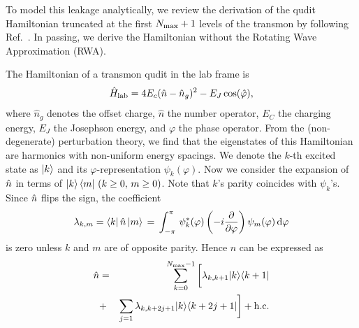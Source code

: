 To model this leakage analytically, we review the derivation of the qudit Hamiltonian truncated at the first $N_{\mathrm{max}}+1$
levels of the transmon by following Ref.~\cite{99999}.
In passing, we derive the Hamiltonian without the Rotating Wave Approximation (RWA)\cite{Fujii2017}.

The Hamiltonian of a transmon qudit in the lab frame is \cite{wong2025hardware}
\begin{equation}
  \hat{H}_{\text{lab}} = 4E_c({\hat{n}} - {\hat{n}}_g)^2 - E_J \cos(\hat{\varphi}), \label{eq:lab}
\end{equation}
where $\hat{n}_g$ denotes the offset charge, $\hat{n}$ the number operator, $E_C$ the charging energy, $E_J$ the Josephson
energy, and $\varphi$ the phase operator.
From the (non-degenerate) perturbation theory, we find that the eigenstates of this Hamiltonian are
harmonics with non-uniform energy spacings.
We denote the $k$-th excited state as $\ket{k}$ and its $\varphi$-representation $\psi_k(\varphi)$.
Now we consider the expansion of ${\hat{n}}$ in terms of $\ket{k}\bra{m}\, (k\geq 0,\, m\geq 0)$.
Note that $k$'s parity coincides with $\psi_k$'s.
Since ${\hat{n}}$ flips the sign, the coefficient
\begin{equation}
  \lambda_{k,m}=\bra{k}{\hat{n}}\ket{m}\,=\,\int_{-\pi}^\pi\,\psi_k^*(\varphi)\left(-i\dfrac{\partial}{\partial \varphi}\right)\psi_m(\varphi)\,\mathrm{d}\varphi
\end{equation}
is zero unless $k$ and $m$ are of opposite parity.
Hence $\hat{n}$ can be expressed as
\begin{eqnarray}\nonumber
  \hat{n}&=&\sum_{k=0}^{N_{{\rm{max}}}-1}\bigg[\lambda_{k,k+1}\vert k \rangle \langle k+1 \vert\\
    &+&\sum_{j=1} \lambda_{k,k+2j+1}\vert k \rangle \langle k+2j+1 \vert\bigg]+\rm{h.c}.
\end{eqnarray}

